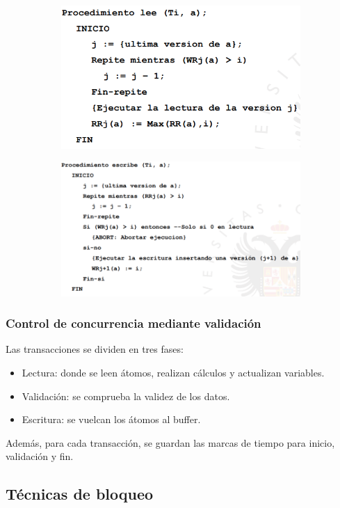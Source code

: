 \begin{figure}[H]
\centering
\begin{subfigure}{.5\textwidth}
  \centering
  \includegraphics[width=\linewidth]{img/43.png}
\end{subfigure}%
\begin{subfigure}{.5\textwidth}
  \centering
  \includegraphics[width=\linewidth]{img/44.png}
\end{subfigure}
\end{figure}

\subsubsection{Control de concurrencia mediante validación}

Las transacciones se dividen en tres fases:
\begin{itemize}
\item Lectura: donde se leen átomos, realizan cálculos y actualizan variables.
\item Validación: se comprueba la validez de los datos.
\item Escritura: se vuelcan los átomos al buffer.
\end{itemize}
Además, para cada transacción, se guardan las marcas de tiempo para inicio, validación y fin.

\subsection{Técnicas de bloqueo}
